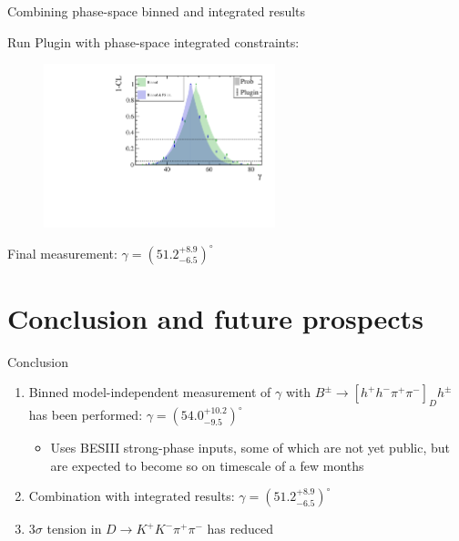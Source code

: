\documentclass[xcolor={dvipsnames}]{beamer}
\begin{document}
\begin{frame}{Combining phase-space binned and integrated results}
  \begin{center}
    Run Plugin with phase-space integrated constraints:
  \end{center}
  \begin{figure}
    \centering
    \includegraphics[width=0.6\textwidth]{Plots/gamma_plugin_scan_GLW.pdf}
  \end{figure}
  \vspace{-0.3cm}
  \begin{center}
    Final measurement: $\gamma = (51.2_{-6.5}^{+8.9})^\circ$ \\
  \end{center}
\end{frame}

\section{Conclusion and future prospects}
\begin{frame}{Conclusion}
  \vspace{-0.1cm}
  \begin{enumerate}
    \setlength\itemsep{1.5em}
    \item{Binned model-independent measurement of $\gamma$ with $B^\pm\to[h^+h^-\pi^+\pi^-]_Dh^\pm$ has been performed: $\gamma = (54.0_{-9.5}^{+10.2})^\circ$}
    \begin{itemize}
      \item{Uses BESIII strong-phase inputs, some of which are not yet public, but are expected to become so on timescale of a few months}
    \end{itemize}
    \item{Combination with integrated results: $\gamma = (51.2_{-6.5}^{+8.9})^\circ$}
    \item{$3\sigma$ tension in $D\to K^+K^-\pi^+\pi^-$ has reduced}
  \end{enumerate}
\end{frame}
\end{document}
